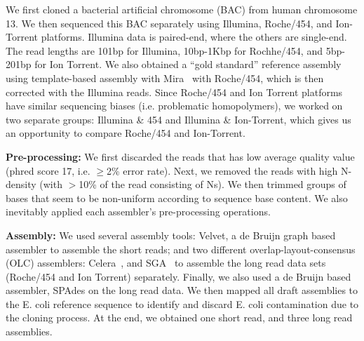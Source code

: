 \documentclass[12pt]{article}
\begin{document}
We first cloned a bacterial artificial chromosome (BAC) from human chromosome 13. We then sequenced this BAC separately using Illumina,  Roche/454, and Ion-Torrent platforms. Illumina data is paired-end, where the others are single-end. The read lengths are 101bp for Illumina, 10bp-1Kbp for Rochhe/454,   and 5bp-201bp for Ion Torrent. We also obtained a ``gold standard'' reference assembly using 
template-based assembly with Mira~\cite{mira} with Roche/454, which is then corrected with the Illumina reads. Since Roche/454 and Ion Torrent platforms have similar sequencing biases (i.e. problematic homopolymers), we worked on two separate groups: Illumina \& 454 and Illumina \& Ion-Torrent, which gives us an opportunity to compare Roche/454 and Ion-Torrent.

%
\textbf{Pre-processing:} We first discarded the reads that has low average quality value (phred score 17, i.e. $\geq$2\% error rate). Next, we removed the reads with high N-density (with $>$10\% of the read consisting of Ns). We then trimmed groups of bases that seem to be non-uniform according 
to sequence base content. We also inevitably applied each assembler's pre-processing operations.

\textbf{Assembly:} We used several assembly tools: Velvet\cite{velvetZerbino:2008}, a de Bruijn graph based assembler to assemble the short reads; and two different overlap-layout-consensus (OLC) assemblers: Celera~\cite{celera:2000}, and SGA~\cite{sga:2012} to assemble the long read data sets (Roche/454 and Ion Torrent) separately. Finally, we also used a de Bruijn based assembler, SPAdes\cite{spadesBankevich:2012} on the long read data. 
We then mapped all draft assemblies to the E. coli reference sequence to identify and discard E. coli contamination due to the cloning process. At the end,
 we obtained one short read, and three long read assemblies.
\end{document}
